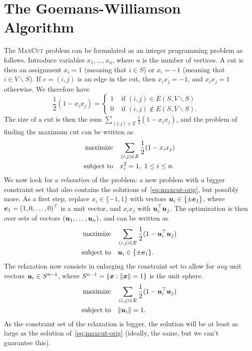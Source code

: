 \section{The Goemans-Williamson Algorithm}
The \textsc{MaxCut} problem can be formulated as an integer programming problem as follows. Introduce variables $x_1,\dots,x_n$, where $n$ is the number of vertices. A cut is then an assignment $x_i=1$ (meaning that $i\in S$) or $x_i=-1$ (meaning that $i\in V\backslash S$). If $e=(i,j)$ is an edge in the cut, then $x_ix_j=-1$, and $x_ix_j=1$ otherwise. We therefore have
\begin{equation*}
 \frac{1}{2}(1-x_ix_j) = \begin{cases}
                          1 & \text{ if } (i,j) \in E(S,V\backslash S)\\
                          0 & \text{ if } (i,j) \not\in E(S,V\backslash S).
                         \end{cases}
\end{equation*}
The size of a cut is then the sum $\sum_{(i,j)\in E} \frac{1}{2}(1-x_ix_j)$, and the problem of finding the maximum cut can be written as
\begin{align}\label{eq:maxcut-orig}
\begin{split}
 \text{maximize}\quad & \sum_{(i,j)\in E} \frac{1}{2}(1-x_ix_j)\\
 \quad\text{subject to}\quad & x_i^2=1, \ 1\leq i\leq n.
\end{split}
 \end{align}
We now look for a {\em relaxation} of the problem: a new problem with a bigger constraint set that also contains the solutions of~\eqref{eq:maxcut-orig}, but possibly more. As a first step, replace $x_i\in \{-1,1\}$ with vectors $\bm{u}_i\in \{\pm \bm{e}_1\}$, where $\bm{e}_1=(1,0,\dots,0)^{\top}$ is a unit vector, and $x_ix_j$ with $\bm{u}_i^{\top}\bm{u}_j$. The optimization is then over sets of vectors $(\bm{u}_1,\dots,\bm{u}_n)$, and can be written as
\begin{align*}
\text{maximize}\quad & \sum_{(i,j)\in E} \frac{1}{2}(1-\bm{u}_i^{\top}\bm{u}_j)\\
\quad\text{subject to}\quad & \bm{u}_i\in \{\pm \bm{e}_1\}.
\end{align*}
The relaxation now consists in enlarging the constraint set to allow for {\em any} unit vectors $\bm{u}_i\in S^{n-1}$, where $S^{n-1}=\{\bm{x}\mathrel{\mathop{:}} \Vert {\bm{x}}\Vert=1\}$ is the unit sphere.
\begin{align}\label{eq:relax1}
\begin{split}
\text{maximize}\quad & \sum_{(i,j)\in E} \frac{1}{2}(1-\bm{u}_i^{\top}\bm{u}_j)\\
\quad\text{subject to}\quad & \Vert {\bm{u}_i}\Vert=1.
\end{split}
\end{align}
As the constraint set of the relaxation is bigger, the solution will be at least as large as the solution of~\eqref{eq:maxcut-orig} (ideally, the same, but we can't guarantee this).

